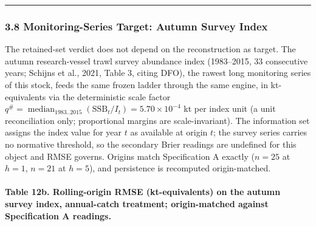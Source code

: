 \documentclass[11pt]{article}
\begin{document}
\begin{center}\rule{0.5\linewidth}{0.5pt}\end{center}

\subsubsection{3.8 Monitoring-Series Target: Autumn Survey
Index}\label{monitoring-series-target-autumn-survey-index}

The retained-set verdict does not depend on the reconstruction as
target. The autumn research-vessel trawl survey abundance index
(1983--2015, 33 consecutive years; Schijns et al., 2021, Table 3, citing
DFO), the rawest long monitoring series of this stock, feeds the same
frozen ladder through the same engine, in kt-equivalents via the
deterministic scale factor
\(q^{\#} = \operatorname{median}_{1983..2015}(\mathrm{SSB}_t / I_t) = 5.70 \times 10^{-4}\)
kt per index unit (a unit reconciliation only; proportional margins are
scale-invariant). The information set assigns the index value for year
\(t\) as available at origin \(t\); the survey series carries no
normative threshold, so the secondary Brier readings are undefined for
this object and RMSE governs. Origins match Specification A exactly
(\(n = 25\) at \(h=1\), \(n = 21\) at \(h=5\)), and persistence is
recomputed origin-matched.

\paragraph{Table 12b. Rolling-origin RMSE (kt-equivalents) on the autumn
survey index, annual-catch treatment; origin-matched against
Specification A
readings.}\label{table-12b.-rolling-origin-rmse-kt-equivalents-on-the-autumn-survey-index-annual-catch-treatment-origin-matched-against-specification-a-readings.}
\end{document}
